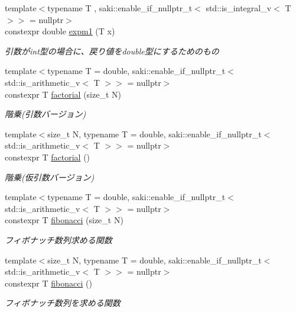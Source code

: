 \begin{DoxyCompactItemize}
{\footnotesize template$<$typename T , saki\+::enable\+\_\+if\+\_\+nullptr\+\_\+t$<$ std\+::is\+\_\+integral\+\_\+v$<$ T $>$$>$  = nullptr$>$ }\\constexpr double \mbox{\hyperlink{namespacesaki_ae4490f448ed3d82712306c54d6821788}{expm1}} (T x)
\begin{DoxyCompactList}\small\item\em 引数がint型の場合に、戻り値をdouble型にするためのもの \end{DoxyCompactList}\item 
{\footnotesize template$<$typename T  = double, saki\+::enable\+\_\+if\+\_\+nullptr\+\_\+t$<$ std\+::is\+\_\+arithmetic\+\_\+v$<$ T $>$$>$  = nullptr$>$ }\\constexpr T \mbox{\hyperlink{namespacesaki_abc9efa0d579d2d20a9d63ea60b5c6739}{factorial}} (size\+\_\+t N)
\begin{DoxyCompactList}\small\item\em 階乗(引数バージョン) \end{DoxyCompactList}\item 
{\footnotesize template$<$size\+\_\+t N, typename T  = double, saki\+::enable\+\_\+if\+\_\+nullptr\+\_\+t$<$ std\+::is\+\_\+arithmetic\+\_\+v$<$ T $>$$>$  = nullptr$>$ }\\constexpr T \mbox{\hyperlink{namespacesaki_a07ba6ea3370958e478c11116a22fa3b8}{factorial}} ()
\begin{DoxyCompactList}\small\item\em 階乗(仮引数バージョン) \end{DoxyCompactList}\item 
{\footnotesize template$<$typename T  = double, saki\+::enable\+\_\+if\+\_\+nullptr\+\_\+t$<$ std\+::is\+\_\+arithmetic\+\_\+v$<$ T $>$$>$  = nullptr$>$ }\\constexpr T \mbox{\hyperlink{namespacesaki_a2cf00e678b37e53b924241bc7ece7b24}{fibonacci}} (size\+\_\+t N)
\begin{DoxyCompactList}\small\item\em フィボナッチ数列求める関数 \end{DoxyCompactList}\item 
{\footnotesize template$<$size\+\_\+t N, typename T  = double, saki\+::enable\+\_\+if\+\_\+nullptr\+\_\+t$<$ std\+::is\+\_\+arithmetic\+\_\+v$<$ T $>$$>$  = nullptr$>$ }\\constexpr T \mbox{\hyperlink{namespacesaki_ac830e7b8acb5cda194f6ba9f340e5bc0}{fibonacci}} ()
\begin{DoxyCompactList}\small\item\em フィボナッチ数列を求める関数 \end{DoxyCompactList}\item 

\end{DoxyCompactItemize}
